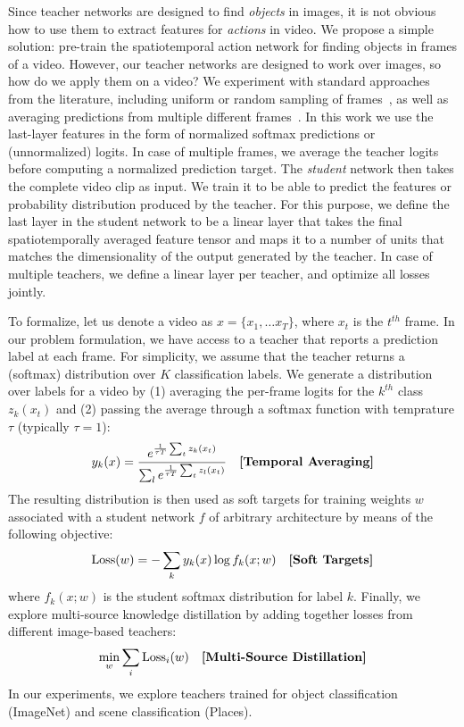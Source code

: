 \documentclass[10pt,twocolumn,letterpaper]{article}
\begin{document}
Since teacher networks are designed to find {\em objects
} in images, it is not obvious how to use them to extract features for {\em actions} in video. We propose a 
simple 
solution: pre-train the spatiotemporal action network for finding objects in frames of a video.
However, our teacher networks are designed to work over images, 
so how do we apply them on a video?
We experiment with standard
approaches from the literature, including uniform or random sampling of frames~\cite{Simonyan_14b},
as well as averaging predictions from multiple different frames~\cite{WangL_16a}.
In this work we use the last-layer features in the form of normalized softmax predictions or (unnormalized) logits.   
In case of multiple
frames, we average the teacher logits before computing a normalized prediction target.
The {\em student} network then takes the complete video clip as input.
We train it to be able to predict the features or probability distribution produced by the teacher.
For this purpose, we define the last layer in the student network to be a linear layer that takes the final spatiotemporally averaged feature tensor and maps it to a number of units that matches the dimensionality of the output generated by the teacher. In case of multiple teachers, we define 
a linear layer per teacher, and
optimize all losses jointly.

To formalize, let us denote a video as $x = \{x_1,\ldots x_T\}$, where $x_t$ is the $t^{th}$ frame. In our problem formulation, we have access to a teacher that reports a prediction label at each frame. For simplicity, we assume that the teacher returns a (softmax) distribution over $K$ classification labels. We generate a distribution over labels for a video by (1) averaging the per-frame logits for the $k^{th}$ class $z_k(x_t)$ and (2) passing the average through a softmax function with temprature $\tau$ (typically $\tau=1$):
\begin{align}
y_k(x) =  \frac{e^{\frac{1}{\tau T}\sum_t z_k(x_t)}}{\sum_l e^{\frac{1}{\tau T}\sum_t z_l(x_t)}} \quad \text{\bf [Temporal Averaging]} 
\end{align}
The resulting distribution is then used as soft targets for training weights $w$ associated with a student network $f$ of arbitrary architecture by means of the following objective:
\begin{align}
     \text{Loss}(w) = -\sum_k y_k(x) \log f_k(x;w) \quad \text{\bf [Soft Targets]} 
\end{align}
\noindent where $f_k(x;w)$ is the student softmax distribution for label $k$. Finally, we explore multi-source knowledge distillation by adding together losses from different image-based teachers:
\begin{align}
     \min_w \sum_i\text{Loss}_i(w) \quad \text{\bf [Multi-Source Distillation]}
\end{align}
In our experiments, we explore teachers trained for object classification (ImageNet) and scene classification (Places).
\end{document}
